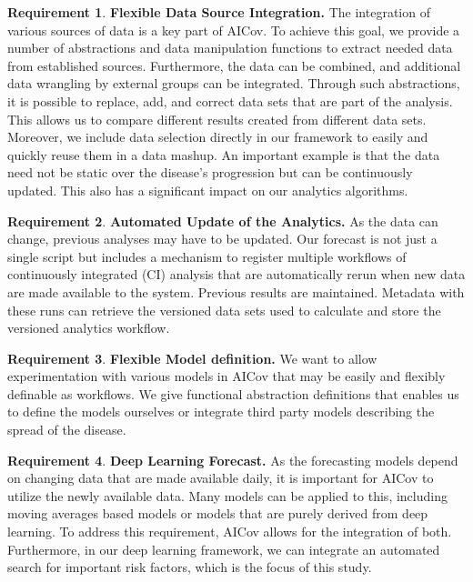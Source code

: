 \documentclass[12pt]{article}
\theoremstyle{definition}
\newtheorem{requirement}{Requirement}
\renewcommand{\_}{%
    \textunderscore\hspace{0pt}%
}
\begin{document}
\begin{requirement}{\bf Flexible Data Source Integration.}
  The integration of various sources of data is a key part of
  AICov. \Solution To achieve this goal, we provide a number of
  abstractions and data manipulation functions to extract needed data
  from established sources. Furthermore, the data can be combined, and
  additional data wrangling by external groups can be integrated.
  Through such abstractions, it is possible to replace, add, and
  correct data sets that are part of the analysis. This allows us to
  compare different results created from different data
  sets. Moreover, we include data selection directly in our framework
  to easily and quickly reuse them in a data mashup. An important
  example is that the data need not be static over the disease's
  progression but can be continuously updated. This also has a
  significant impact on our analytics algorithms.
\end{requirement}

\begin{requirement}{\bf Automated Update of the Analytics.}
  As the data can change, previous analyses may have to be
  updated. \Solution Our forecast is not just a single script but
  includes a mechanism to register multiple workflows of continuously
  integrated (CI) analysis that are automatically rerun when new data
  are made available to the system. Previous results are
  maintained. Metadata with these runs can retrieve the versioned data
  sets used to calculate and store the versioned analytics workflow.
\end{requirement}

\begin{requirement}{\bf Flexible Model definition.}
  We want to allow experimentation with various models in AICov that
  may be easily and flexibly definable as workflows. \Solution We give
  functional abstraction definitions that enables us to define the
  models ourselves or integrate third party models describing the
  spread of the disease.
\end{requirement}

\begin{requirement}{\bf Deep Learning Forecast.}
  As the forecasting models depend on changing data that are made
  available daily, it is important for AICov to utilize the newly
  available data. Many models can be applied to this, including moving
  averages based models or models that are purely derived from deep
  learning. \Solution To address this requirement, AICov allows for
  the integration of both. Furthermore, in our deep learning
  framework, we can integrate an automated search for important risk
  factors, which is the focus of this study.
\end{requirement}
\end{document}
